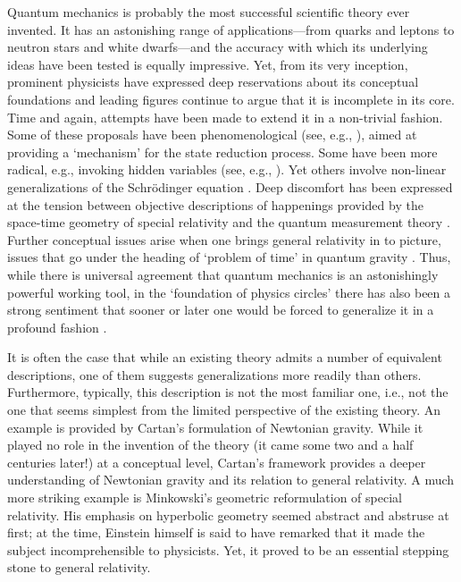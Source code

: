 Quantum mechanics is probably the most successful scientific theory
ever invented. It has an astonishing range of applications---from
quarks and leptons to neutron stars and white dwarfs---and the
accuracy with which its underlying ideas have been tested is equally
impressive. Yet, from its very inception, prominent physicists have
expressed deep reservations about its conceptual foundations and
leading figures continue to argue that it is incomplete in its
core. Time and again, attempts have been made to extend it in a
non-trivial fashion. Some of these proposals have been
phenomenological (see, e.g., \cite{grw,pearle1,ggr}), aimed at
providing a `mechanism' for the state reduction process. Some have
been more radical, e.g., invoking hidden variables (see, e.g.,
\cite{jb1}). Yet others involve non-linear generalizations of the
Schr\"odinger equation \cite{birula,pearle2,weinberg}. Deep discomfort
has been expressed at the tension between objective descriptions of
happenings provided by the space-time geometry of special relativity
and the quantum measurement theory \cite{pearle3,jb2}. Further
conceptual issues arise when one brings general relativity in to
picture, issues that go under the heading of `problem of time' in
quantum gravity \cite{as,kk,ci1}. Thus, while there is universal
agreement that quantum mechanics is an astonishingly powerful working
tool, in the `foundation of physics circles' there has also been a
strong sentiment that sooner or later one would be forced to
generalize it in a profound fashion \cite{rp1,gh,ci2}.

It is often the case that while an existing theory admits a number of
equivalent descriptions, one of them suggests generalizations more
readily than others. Furthermore, typically, this description is not
the most familiar one, i.e., not the one that seems simplest from the
limited perspective of the existing theory. An example is provided by
Cartan's formulation of Newtonian gravity. While it played no role in
the invention of the theory (it came some two and a half centuries
later!) at a conceptual level, Cartan's framework provides a deeper
understanding of Newtonian gravity and its relation to general
relativity. A much more striking example is Minkowski's geometric
reformulation of special relativity.  His emphasis on hyperbolic
geometry seemed abstract and abstruse at first; at the time, Einstein
himself is said to have remarked that it made the subject
incomprehensible to physicists. Yet, it proved to be an essential
stepping stone to general relativity.

